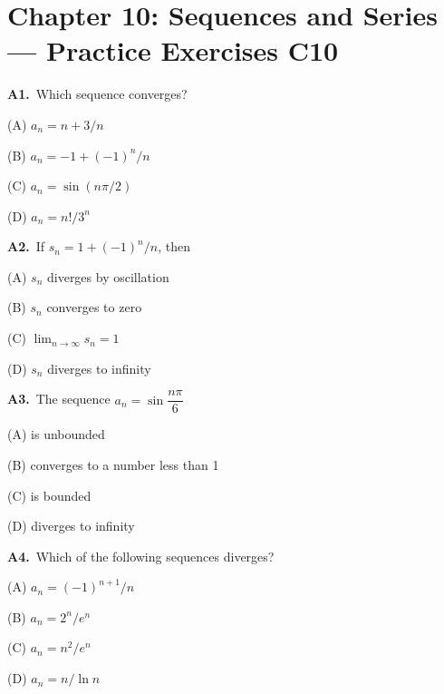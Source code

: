 \documentclass[11pt]{article}
\begin{document}
\section*{Chapter 10: Sequences and Series --- Practice Exercises C10}

\bigskip\noindent\textbf{A1.}\ Which sequence converges?
\begin{list}{}{\setlength{\leftmargin}{3em}\setlength{\labelwidth}{2.5em}\setlength{\itemsep}{0pt}\setlength{\topsep}{2pt}}
\item[(A)] $a_n=n+3/n$
\item[(B)] $a_n=-1+(-1)^n/n$
\item[(C)] $a_n=\sin(n\pi/2)$
\item[(D)] $a_n=n!/3^n$
\end{list}

\bigskip\noindent\textbf{A2.}\ If $s_n=1+(-1)^n/n$, then
\begin{list}{}{\setlength{\leftmargin}{3em}\setlength{\labelwidth}{2.5em}\setlength{\itemsep}{0pt}\setlength{\topsep}{2pt}}
\item[(A)] $s_n$ diverges by oscillation
\item[(B)] $s_n$ converges to zero
\item[(C)] $\lim_{n\to\infty}s_n=1$
\item[(D)] $s_n$ diverges to infinity
\end{list}

\bigskip\noindent\textbf{A3.}\ The sequence $a_n = \sin\dfrac{n\pi}{6}$
\begin{list}{}{\setlength{\leftmargin}{3em}\setlength{\labelwidth}{2.5em}\setlength{\itemsep}{0pt}\setlength{\topsep}{2pt}}
\item[(A)] is unbounded
\item[(B)] converges to a number less than 1
\item[(C)] is bounded
\item[(D)] diverges to infinity
\end{list}

\bigskip\noindent\textbf{A4.}\ Which of the following sequences diverges?
\begin{list}{}{\setlength{\leftmargin}{3em}\setlength{\labelwidth}{2.5em}\setlength{\itemsep}{0pt}\setlength{\topsep}{2pt}}
\item[(A)] $a_n=(-1)^{n+1}/n$
\item[(B)] $a_n=2^n/e^n$
\item[(C)] $a_n=n^2/e^n$
\item[(D)] $a_n=n/\ln n$
\end{list}
\end{document}
